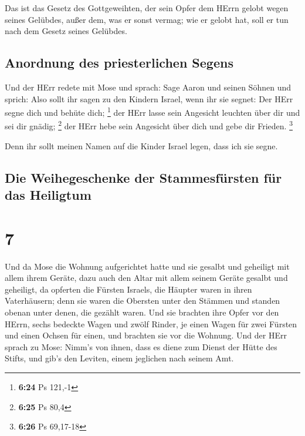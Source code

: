  Das ist das Gesetz des Gottgeweihten, der sein Opfer dem
HErrn gelobt wegen seines Gelübdes, außer dem, was er sonst vermag; wie
er gelobt hat, soll er tun nach dem Gesetz seines Gelübdes.

\hypertarget{anordnung-des-priesterlichen-segens}{%
\subsection{Anordnung des priesterlichen
Segens}\label{anordnung-des-priesterlichen-segens}}

 Und der HErr redete mit Mose und sprach: 
Sage Aaron und seinen Söhnen und sprich: Also sollt ihr sagen zu den
Kindern Israel, wenn ihr sie segnet:  Der HErr segne dich
und behüte dich; \footnote{\textbf{6:24} Ps 121,-1}  der
HErr lasse sein Angesicht leuchten über dir und sei dir gnädig;
\footnote{\textbf{6:25} Ps 80,4}  der HErr hebe sein
Angesicht über dich und gebe dir Frieden. \footnote{\textbf{6:26} Ps
  69,17-18}

 Denn ihr sollt meinen Namen auf die Kinder Israel legen,
dass ich sie segne.

\hypertarget{die-weihegeschenke-der-stammesfuxfcrsten-fuxfcr-das-heiligtum}{%
\subsection{Die Weihegeschenke der Stammesfürsten für das
Heiligtum}\label{die-weihegeschenke-der-stammesfuxfcrsten-fuxfcr-das-heiligtum}}

\hypertarget{section-6}{%
\section{7}\label{section-6}}

 Und da Mose die Wohnung aufgerichtet hatte und sie
gesalbt und geheiligt mit allem ihrem Geräte, dazu auch den Altar mit
allem seinem Geräte gesalbt und geheiligt,  da opferten
die Fürsten Israels, die Häupter waren in ihren Vaterhäusern; denn sie
waren die Obersten unter den Stämmen und standen obenan unter denen, die
gezählt waren.  Und sie brachten ihre Opfer vor den HErrn,
sechs bedeckte Wagen und zwölf Rinder, je einen Wagen für zwei Fürsten
und einen Ochsen für einen, und brachten sie vor die Wohnung.
 Und der HErr sprach zu Mose:  Nimm's von
ihnen, dass es diene zum Dienst der Hütte des Stifts, und gib's den
Leviten, einem jeglichen nach seinem Amt.

